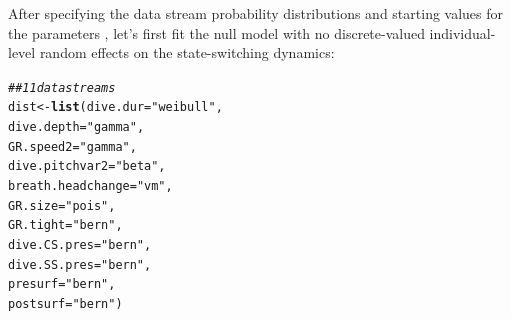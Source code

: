 \documentclass[12pt]{article}\usepackage[]{graphicx}\usepackage[]{xcolor}
\makeatletter
\newcommand{\hlstr}[1]{\textcolor[rgb]{0.192,0.494,0.8}{#1}}%
\newcommand{\hlcom}[1]{\textcolor[rgb]{0.678,0.584,0.686}{\textit{#1}}}%
\newcommand{\hlstd}[1]{\textcolor[rgb]{0.345,0.345,0.345}{#1}}%
\newcommand{\hlkwb}[1]{\textcolor[rgb]{0.69,0.353,0.396}{#1}}%
\newcommand{\hlkwc}[1]{\textcolor[rgb]{0.333,0.667,0.333}{#1}}%
\newcommand{\hlkwd}[1]{\textcolor[rgb]{0.737,0.353,0.396}{\textbf{#1}}}%
\newenvironment{kframe}{%
 \def\at@end@of@kframe{}%
 \ifinner\ifhmode%
  \def\at@end@of@kframe{\end{minipage}}%
  \begin{minipage}{\columnwidth}%
 \fi\fi%
 \def\FrameCommand##1{\hskip\@totalleftmargin \hskip-\fboxsep
 \colorbox{shadecolor}{##1}\hskip-\fboxsep
     \hskip-\linewidth \hskip-\@totalleftmargin \hskip\columnwidth}%
 \MakeFramed {\advance\hsize-\width
   \@totalleftmargin\z@ \linewidth\hsize
   \@setminipage}}%
 {\par\unskip\endMakeFramed%
 \at@end@of@kframe}
\newenvironment{knitrout}{}{} %
\makeatother
\begin{document}
After specifying the data stream probability distributions and starting values for the parameters \citep[based on those reported by ][]{IsojunnoEtAl2017}, let's first fit the null model with no discrete-valued individual-level random effects on the state-switching dynamics:
\begin{knitrout}
\color{fgcolor}\begin{kframe}
\begin{alltt}
\hlcom{## 11 data streams}
\hlstd{dist} \hlkwb{<-} \hlkwd{list}\hlstd{(}\hlkwc{dive.dur} \hlstd{=} \hlstr{"weibull"}\hlstd{,}
             \hlkwc{dive.depth} \hlstd{=} \hlstr{"gamma"}\hlstd{,}
             \hlkwc{GR.speed2} \hlstd{=} \hlstr{"gamma"}\hlstd{,}
             \hlkwc{dive.pitchvar2} \hlstd{=} \hlstr{"beta"}\hlstd{,}
             \hlkwc{breath.headchange} \hlstd{=} \hlstr{"vm"}\hlstd{,}
             \hlkwc{GR.size} \hlstd{=} \hlstr{"pois"}\hlstd{,}
             \hlkwc{GR.tight} \hlstd{=} \hlstr{"bern"}\hlstd{,}
             \hlkwc{dive.CS.pres} \hlstd{=} \hlstr{"bern"}\hlstd{,}
             \hlkwc{dive.SS.pres} \hlstd{=} \hlstr{"bern"}\hlstd{,}
             \hlkwc{presurf} \hlstd{=} \hlstr{"bern"}\hlstd{,}
             \hlkwc{postsurf} \hlstd{=} \hlstr{"bern"}\hlstd{)}


\end{alltt}
\end{kframe}
\end{knitrout}
\end{document}
